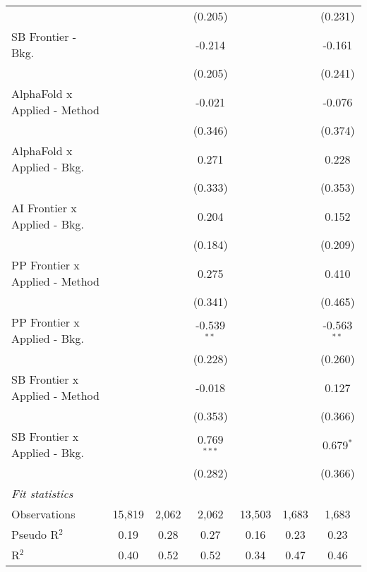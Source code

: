 \begin{tabular}{lcccccc}
                                  &         &                & (0.205)       &              &              & (0.231)\\   
   SB Frontier - Bkg.             &         &                & -0.214        &              &              & -0.161\\   
                                  &         &                & (0.205)       &              &              & (0.241)\\   
   AlphaFold x Applied - Method   &         &                & -0.021        &              &              & -0.076\\   
                                  &         &                & (0.346)       &              &              & (0.374)\\   
   AlphaFold x Applied - Bkg.     &         &                & 0.271         &              &              & 0.228\\   
                                  &         &                & (0.333)       &              &              & (0.353)\\   
   AI Frontier x Applied - Bkg.   &         &                & 0.204         &              &              & 0.152\\   
                                  &         &                & (0.184)       &              &              & (0.209)\\   
   PP Frontier x Applied - Method &         &                & 0.275         &              &              & 0.410\\   
                                  &         &                & (0.341)       &              &              & (0.465)\\   
   PP Frontier x Applied - Bkg.   &         &                & -0.539$^{**}$ &              &              & -0.563$^{**}$\\   
                                  &         &                & (0.228)       &              &              & (0.260)\\   
   SB Frontier x Applied - Method &         &                & -0.018        &              &              & 0.127\\   
                                  &         &                & (0.353)       &              &              & (0.366)\\   
   SB Frontier x Applied - Bkg.   &         &                & 0.769$^{***}$ &              &              & 0.679$^{*}$\\   
                                  &         &                & (0.282)       &              &              & (0.366)\\   
   \midrule
   \emph{Fit statistics}\\
   Observations                   & 15,819  & 2,062          & 2,062         & 13,503       & 1,683        & 1,683\\  
   Pseudo R$^2$                   & 0.19    & 0.28           & 0.27          & 0.16         & 0.23         & 0.23\\  
   R$^2$                          & 0.40    & 0.52           & 0.52          & 0.34         & 0.47         & 0.46\\  
   

\end{tabular}
